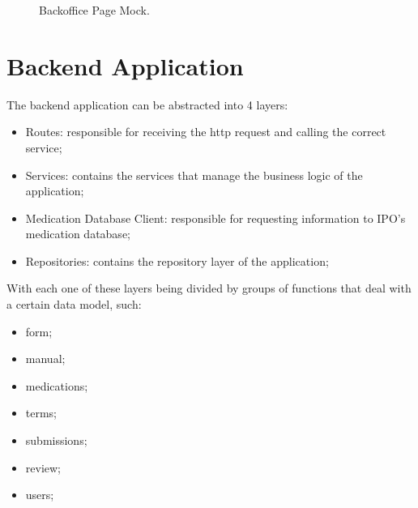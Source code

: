 \begin{figure}[H]
	\begin{center}
	\end{center}
	\caption{Backoffice Page Mock.}\label{fig:backoffice}
\end{figure}

\newpage





\section{Backend Application}

The backend application can be abstracted into 4 layers:
\begin{itemize}
	\item Routes: responsible for receiving the http request and calling the correct service;
	\item Services: contains the services that manage the business logic of the application;
	\item Medication Database Client: responsible for requesting information to IPO's medication database;
	\item Repositories: contains the repository layer of the application;
\end{itemize}

With each one of these layers being divided by groups of functions that deal with a certain data model, such:
\begin{itemize}
	\item form;
	\item manual;
	\item medications;
	\item terms;
	\item submissions;
	\item review;
	\item users;
\end{itemize}

